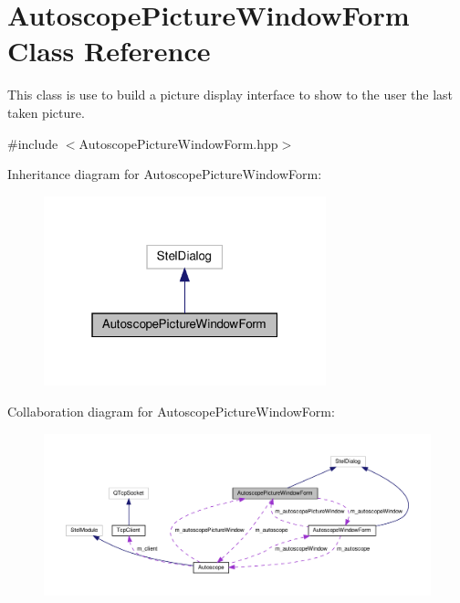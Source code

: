 \hypertarget{class_autoscope_picture_window_form}{}\section{Autoscope\+Picture\+Window\+Form Class Reference}
\label{class_autoscope_picture_window_form}


This class is use to build a picture display interface to show to the user the last taken picture.  




{\ttfamily \#include $<$Autoscope\+Picture\+Window\+Form.\+hpp$>$}



Inheritance diagram for Autoscope\+Picture\+Window\+Form\+:\nopagebreak
\begin{figure}[H]
\begin{center}
\leavevmode
\includegraphics[width=232pt]{class_autoscope_picture_window_form__inherit__graph}
\end{center}
\end{figure}


Collaboration diagram for Autoscope\+Picture\+Window\+Form\+:\nopagebreak
\begin{figure}[H]
\begin{center}
\leavevmode
\includegraphics[width=350pt]{class_autoscope_picture_window_form__coll__graph}
\end{center}
\end{figure}
